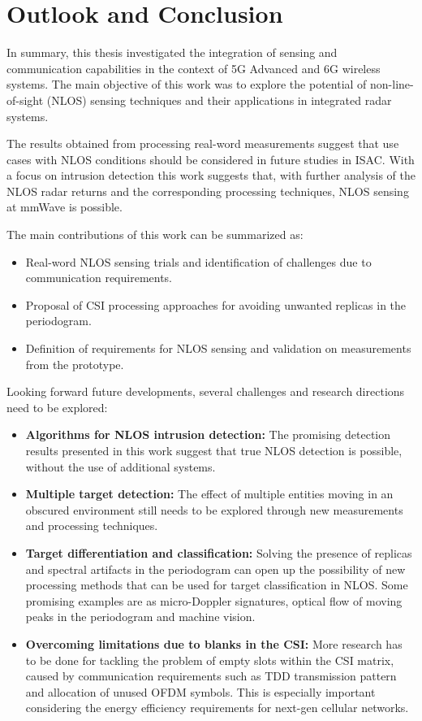 \chapter{Outlook and Conclusion}

In summary, this thesis investigated the integration of sensing and communication capabilities in the context of 5G Advanced and 6G wireless systems. 
The main objective of this work was to explore the potential of non-line-of-sight (NLOS) sensing techniques and their applications in integrated radar systems. 

The results obtained from processing real-word measurements suggest that use cases with NLOS conditions should be considered in future studies in ISAC.
With a focus on intrusion detection this work suggests that, with further analysis of the NLOS radar returns and the corresponding processing techniques, NLOS sensing at mmWave is possible.

The main contributions of this work can be summarized as:

\begin{itemize}
	\item Real-word NLOS sensing trials and identification of challenges due to communication requirements.
	\item Proposal of CSI processing approaches for avoiding unwanted replicas in the periodogram.
	\item Definition of requirements for NLOS sensing and validation on measurements from the prototype.
\end{itemize}

Looking forward future developments, several challenges and research directions need to be explored:

\begin{itemize}
	\item \textbf{Algorithms for NLOS intrusion detection:} The promising detection results presented in this work suggest that true NLOS detection is possible, without the use of additional systems.
	\item \textbf{Multiple target detection:} The effect of multiple entities moving in an obscured environment still needs to be explored through new measurements and processing techniques.
	\item \textbf{Target differentiation and classification:} Solving the presence of replicas and spectral artifacts in the periodogram can open up the possibility of new processing methods that can be used for target classification in NLOS. Some promising examples are as micro-Doppler signatures, optical flow of moving peaks in the periodogram and machine vision.
	\item \textbf{Overcoming limitations due to blanks in the CSI:} More research has to be done for tackling the problem of empty slots within the CSI matrix, caused by communication requirements such as TDD transmission pattern and allocation of unused OFDM symbols. This is especially important considering the energy efficiency requirements for next-gen cellular networks.
\end{itemize}
